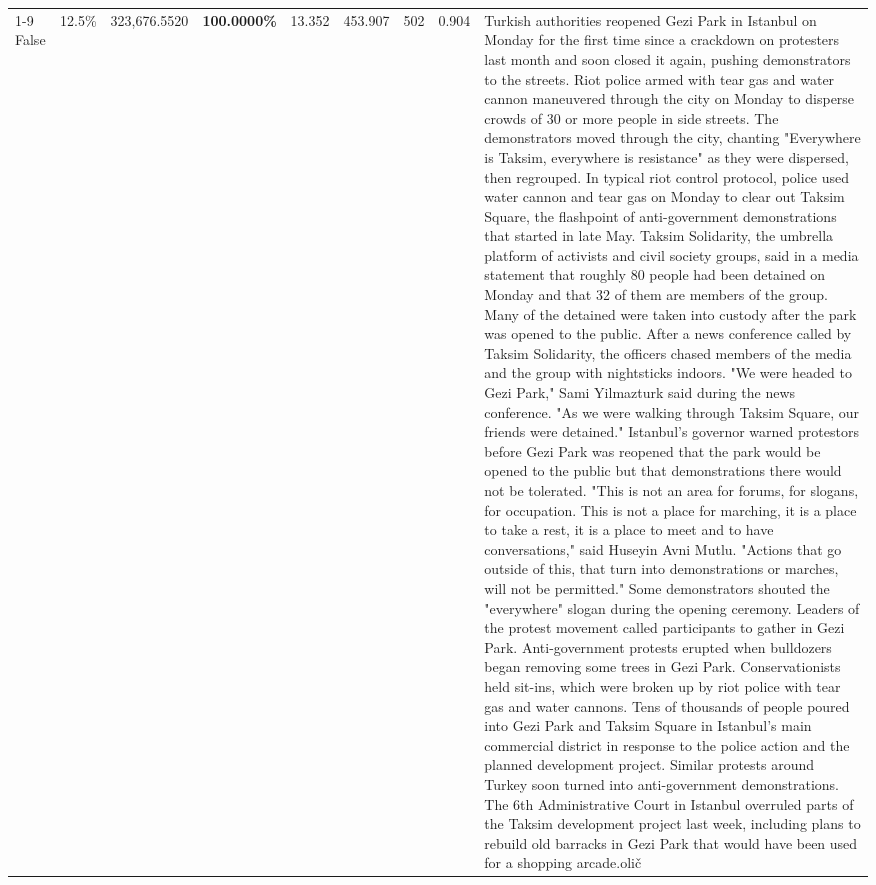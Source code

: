 \begin{table}[H]
\begin{tabular}{lllrlllll}
\cline{1-9}
False & 12.5\% & 323,676.5520 & \bfseries \color{red} 100.0000\% & 13.352 & 453.907 & 502 & 0.904 & Turkish authorities reopened Gezi Park in Istanbul on Monday for the first time since a crackdown on protesters last month and soon closed it again, pushing demonstrators to the streets. Riot police armed with tear gas and water cannon maneuvered through the city on Monday to disperse crowds of 30 or more people in side streets. The demonstrators moved through the city, chanting "Everywhere is Taksim, everywhere is resistance" as they were dispersed, then regrouped. In typical riot control protocol, police used water cannon and tear gas on Monday to clear out Taksim Square, the flashpoint of anti-government demonstrations that started in late May. Taksim Solidarity, the umbrella platform of activists and civil society groups, said in a media statement that roughly 80 people had been detained on Monday and that 32 of them are members of the group. Many of the detained were taken into custody after the park was opened to the public. After a news conference called by Taksim Solidarity, the officers chased members of the media and the group with nightsticks indoors. "We were headed to Gezi Park," Sami Yilmazturk said during the news conference. "As we were walking through Taksim Square, our friends were detained." Istanbul's governor warned protestors before Gezi Park was reopened that the park would be opened to the public but that demonstrations there would not be tolerated. "This is not an area for forums, for slogans, for occupation. This is not a place for marching, it is a place to take a rest, it is a place to meet and to have conversations," said Huseyin Avni Mutlu. "Actions that go outside of this, that turn into demonstrations or marches, will not be permitted." Some demonstrators shouted the "everywhere" slogan during the opening ceremony. Leaders of the protest movement called participants to gather in Gezi Park. Anti-government protests erupted when bulldozers began removing some trees in Gezi Park. Conservationists held sit-ins, which were broken up by riot police with tear gas and water cannons. Tens of thousands of people poured into Gezi Park and Taksim Square in Istanbul's main commercial district in response to the police action and the planned development project. Similar protests around Turkey soon turned into anti-government demonstrations. The 6th Administrative Court in Istanbul overruled parts of the Taksim development project last week, including plans to rebuild old barracks in Gezi Park that would have been used for a shopping arcade.olič \\

\end{tabular}
\end{table}
